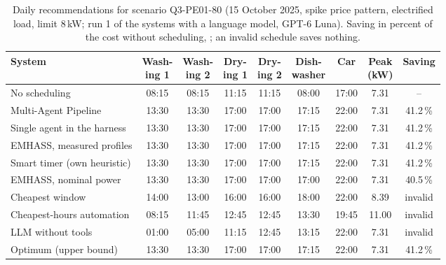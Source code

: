 \documentclass[12pt,a4paper]{report}
\begin{document}
\begin{table}[h!]
\caption{Daily recommendations for scenario Q3-PE01-80 (15 October 2025, spike price pattern, electrified load, limit 8\,kW; run 1 of the systems with a language model, GPT-6 Luna). Saving in percent of the cost without scheduling, ; an invalid schedule saves nothing.}
\label{tab:demo}
\footnotesize
\begin{tabular*}{\textwidth}{@{\extracolsep{\fill}}lcccccccc}
\toprule
System & \makecell{Wash-\\ing 1} & \makecell{Wash-\\ing 2} & \makecell{Dry-\\ing 1} & \makecell{Dry-\\ing 2} & \makecell{Dish-\\washer} & Car & \makecell{Peak\\(kW)} & Saving \\
\midrule
No scheduling & 08:15 & 08:15 & 11:15 & 11:15 & 08:00 & 17:00 & 7.31 & -- \\
Multi-Agent Pipeline & 13:30 & 13:30 & 17:00 & 17:00 & 17:15 & 22:00 & 7.31 & 41.2\,\% \\
Single agent in the harness & 13:30 & 13:30 & 17:00 & 17:00 & 17:15 & 22:00 & 7.31 & 41.2\,\% \\
EMHASS, measured profiles & 13:30 & 13:30 & 17:00 & 17:00 & 17:15 & 22:00 & 7.31 & 41.2\,\% \\
Smart timer (own heuristic) & 13:30 & 13:30 & 17:00 & 17:00 & 17:15 & 22:00 & 7.31 & 41.2\,\% \\
EMHASS, nominal power & 13:30 & 13:30 & 17:00 & 17:00 & 17:00 & 22:00 & 7.31 & 40.5\,\% \\
Cheapest window & 14:00 & 13:00 & 16:00 & 16:00 & 18:00 & 22:00 & 8.39 & invalid \\
Cheapest-hours automation & 08:15 & 11:45 & 12:45 & 12:45 & 13:30 & 19:45 & 11.00 & invalid \\
LLM without tools & 01:00 & 05:00 & 11:15 & 12:45 & 13:15 & 22:00 & 7.31 & invalid \\
\midrule
Optimum (upper bound) & 13:30 & 13:30 & 17:00 & 17:00 & 17:15 & 22:00 & 7.31 & 41.2\,\% \\
\bottomrule
\end{tabular*}
\end{table}
\end{document}
